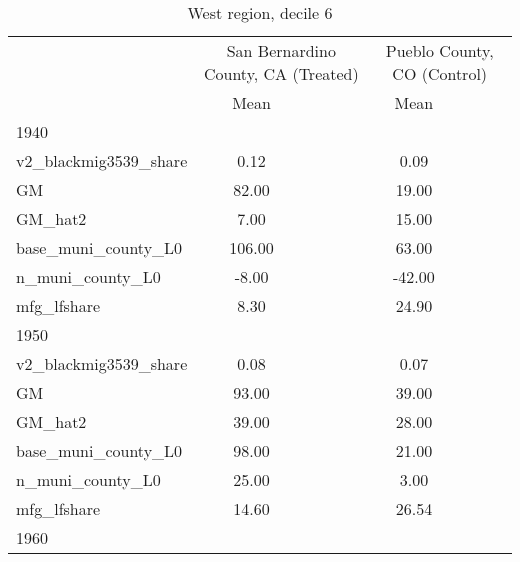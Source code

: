 \begin{table}[htbp]\centering
\def\sym#1{\ifmmode^{#1}\else\(^{#1}\)\fi}
\caption{West region, decile 6 \label{tab1}}
\begin{tabular}{l*{2}{ccc}}
\toprule
                    &\multicolumn{3}{c}{San Bernardino County, CA (Treated)}&\multicolumn{3}{c}{Pueblo County, CO (Control)}\\
                    &        Mean&            &            &        Mean&            &            \\
\midrule
1940                &            &            &            &            &            &            \\
v2\_blackmig3539\_share&        0.12&            &            &        0.09&            &            \\
GM                  &       82.00&            &            &       19.00&            &            \\
GM\_hat2             &        7.00&            &            &       15.00&            &            \\
base\_muni\_county\_L0 &      106.00&            &            &       63.00&            &            \\
n\_muni\_county\_L0    &       -8.00&            &            &      -42.00&            &            \\
mfg\_lfshare         &        8.30&            &            &       24.90&            &            \\
\midrule
1950                &            &            &            &            &            &            \\
v2\_blackmig3539\_share&        0.08&            &            &        0.07&            &            \\
GM                  &       93.00&            &            &       39.00&            &            \\
GM\_hat2             &       39.00&            &            &       28.00&            &            \\
base\_muni\_county\_L0 &       98.00&            &            &       21.00&            &            \\
n\_muni\_county\_L0    &       25.00&            &            &        3.00&            &            \\
mfg\_lfshare         &       14.60&            &            &       26.54&            &            \\
\midrule
1960                &            &            &            &            &            &            \\

\end{tabular}
\end{table}
